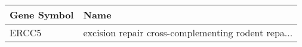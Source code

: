 \begin{tabular}{ll}
\toprule
Gene Symbol &                                               Name \\
\midrule
      ERCC5 & excision repair cross-complementing rodent repa... \\
\bottomrule
\end{tabular}
